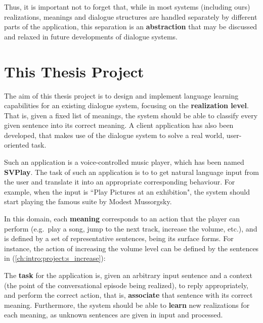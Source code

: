 Thus, it is important not to forget that, while in most systems (including ours) realizations, meanings and dialogue structures are handled separately by different parts of the application, this separation is an \textbf{abstraction} that may be discussed and relaxed in future developments of dialogue systems.


\section{This Thesis Project} \label{ch:intro:project}

The aim of this thesis project is to design and implement language learning capabilities for an existing dialogue system, focusing on the \textbf{realization level}. That is, given a fixed list of meanings, the system should be able to classify every given sentence into its correct meaning. A client application has also been developed, that makes use of the dialogue system to solve a real world, user-oriented task.

Such an application is a voice-controlled music player, which has been named \textbf{SVPlay}. The task of such an application is to to get natural language input from the user and translate it into an appropriate corresponding behaviour. For example, when the input is ``Play Pictures at an exhibition", the system should start playing the famous suite by Modest Mussorgsky.

In this domain, each \textbf{meaning} corresponds to an action that the player can perform (e.g.\ play a song, jump to the next track, increase the volume, etc.), and is defined by a set of representative sentences, being its surface forms. For instance, the action of increasing the volume level can be defined by the sentences in (\ref{ch:intro:project:s_increase}):
 \label{ch:intro:project:s_increase}

The \textbf{task} for the application is, given an arbitrary input sentence and a context (the point of the conversational episode being realized), to reply appropriately, and perform the correct action, that is, \textbf{associate} that sentence with its correct meaning. Furthermore, the system should be able to \textbf{learn} new realizations for each meaning, as unknown sentences are given in input and processed.

